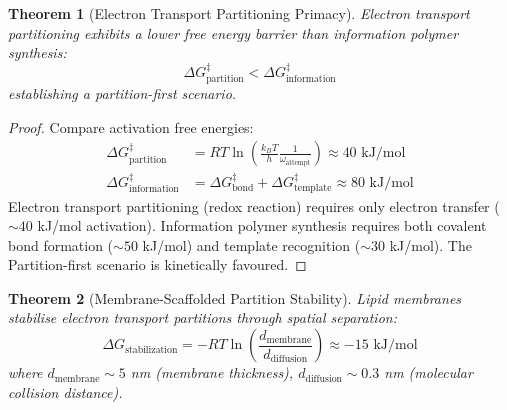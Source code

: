 \documentclass[11pt,a4paper]{article}
\newtheorem{theorem}{Theorem}[section]
\theoremstyle{remark}
\begin{document}
\begin{theorem}[Electron Transport Partitioning Primacy]
\label{thm:electron_primacy}
Electron transport partitioning exhibits a lower free energy barrier than information polymer synthesis:
\begin{equation}
\Delta G^{\ddagger}_{\text{partition}} < \Delta G^{\ddagger}_{\text{information}}
\end{equation}
establishing a partition-first scenario.
\end{theorem}

\begin{proof}
Compare activation free energies:
\begin{align}
\Delta G^{\ddagger}_{\text{partition}} &= RT\ln\left(\frac{k_BT}{h}\frac{1}{\omega_{\text{attempt}}}\right) \approx 40 \text{ kJ/mol} \\
\Delta G^{\ddagger}_{\text{information}} &= \Delta G^{\ddagger}_{\text{bond}} + \Delta G^{\ddagger}_{\text{template}} \approx 80 \text{ kJ/mol}
\end{align}
Electron transport partitioning (redox reaction) requires only electron transfer ($\sim 40$ kJ/mol activation). Information polymer synthesis requires both covalent bond formation ($\sim 50$ kJ/mol) and template recognition ($\sim 30$ kJ/mol). The Partition-first scenario is kinetically favoured.
\end{proof}

\begin{theorem}[Membrane-Scaffolded Partition Stability]
\label{thm:membrane_scaffold}
Lipid membranes stabilise electron transport partitions through spatial separation:
\begin{equation}
\Delta G_{\text{stabilization}} = -RT\ln\left(\frac{d_{\text{membrane}}}{d_{\text{diffusion}}}\right) \approx -15 \text{ kJ/mol}
\end{equation}
where $d_{\text{membrane}} \sim 5$ nm (membrane thickness), $d_{\text{diffusion}} \sim 0.3$ nm (molecular collision distance).
\end{theorem}
\end{document}
